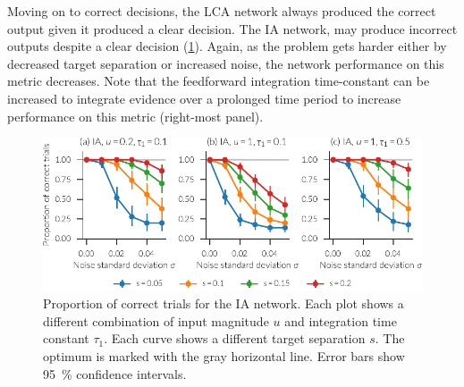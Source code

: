 Moving on to correct decisions, the LCA network always produced the correct output given it produced a clear decision.
The IA network, may produce incorrect outputs despite a clear decision (\cref{fig:ia-correct}).
Again, as the problem gets harder either by decreased target separation or increased noise, the network performance on this metric decreases.
Note that the feedforward integration time-constant can be increased to integrate evidence over a prolonged time period  to increase performance on this metric (right-most panel).
\begin{figure}
    \centering
    \includegraphics{figures/ia-correct}
    \caption[Proportion of correct trials for the IA network.]{Proportion of correct trials for the IA network. Each plot shows a different combination of input magnitude $u$ and integration time constant $\tau_1$. Each curve shows a different target separation $s$. The optimum is marked with the gray horizontal line. Error bars show \SI{95}{\percent} confidence intervals.}\label{fig:ia-correct}
\end{figure}

